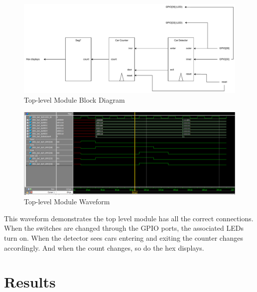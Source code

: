 \documentclass[11pt, titlepage]{article}
\begin{document}
            \begin{figure}[!htb]
                \centering
                \captionsetup{justification=centering}
                
                \includegraphics[scale=0.6]{Images/Lab1 Block Diagram.pdf}
                
                \caption{Top-level Module Block Diagram}
            \end{figure} 
            \begin{figure}[!htb]
                \centering
                \captionsetup{justification=centering}
                
                \includegraphics[scale=0.4]{Images/top level module testbench.png}
                
                \caption{Top-level Module Waveform}
            \end{figure} 
            \newpage
            This waveform demonstrates the top level module has all the correct connections. When the switches are changed through the GPIO ports, the associated LEDs turn on. When the detector sees cars entering and exiting the counter changes accordingly. And when the count changes, so do the hex displays. 
            
    
    \section{Results}
\end{document}

